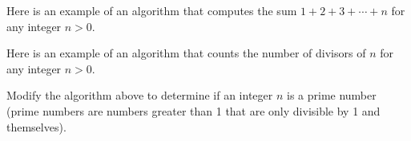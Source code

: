 \documentclass{ximera}
\begin{document}
Here is an example of an algorithm that computes the sum $1+2+3+\cdots+n$ for any integer $n>0$.


Here is an example of an algorithm that counts the number of divisors of $n$ for any integer $n>0$.


Modify the algorithm above to determine if an integer $n$ is a prime number (prime numbers are numbers greater than 1 that are only divisible by 1 and themselves).
\end{document}
